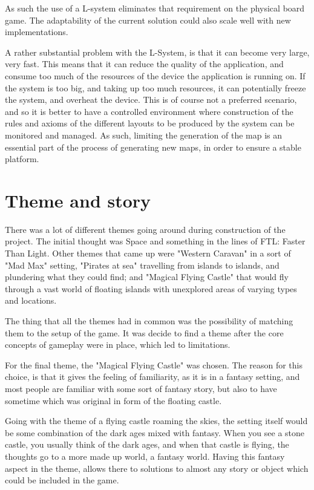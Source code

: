 As such the use of a L-system eliminates that requirement on the physical board game. The adaptability of the current solution could also scale well with new implementations.

A rather substantial problem with the L-System, is that it can become very large, very fast. This means that it can reduce the quality of the application, and consume too much of the resources of the device the application is running on. 
If the system is too big, and taking up too much resources, it can potentially freeze the system, and overheat the device. 
This is of course not a preferred scenario, and so it is better to have a controlled environment where construction of the rules and axioms of the different layouts to be produced by the system can be monitored and managed. As such, limiting the generation of the map is an essential part of the process of generating new maps, in order to ensure a stable platform.

\section{Theme and story}
There was a lot of different themes going around during construction of the project.
The initial thought was Space and something in the lines of FTL: Faster Than Light. Other themes that came up were "Western Caravan" in a sort of "Mad Max" setting, "Pirates at sea" travelling from islands to islands, and plundering what they could find; and "Magical Flying Castle" that would fly through a vast world of floating islands with unexplored areas of varying types and locations. 

The thing that all the themes had in common was the possibility of matching them to the setup of the game.	It was decide to find a theme after the core concepts of gameplay were in place, which led to limitations.

For the final theme, the "Magical Flying Castle" was chosen. The reason for this choice, is that it gives the feeling of familiarity, as it is in a fantasy setting, and most people are familiar with some sort of fantasy story, but also to have sometime which was original in form of the floating castle. 

Going with the theme of a flying castle roaming the skies, the setting itself would be some combination of the dark ages mixed with fantasy. When you see a stone castle, you usually think of the dark ages, and when that castle is flying, the thoughts go to a more made up world, a fantasy world. Having this fantasy aspect in the theme, allows there to solutions to almost any story or object which could be included in the game.
 
